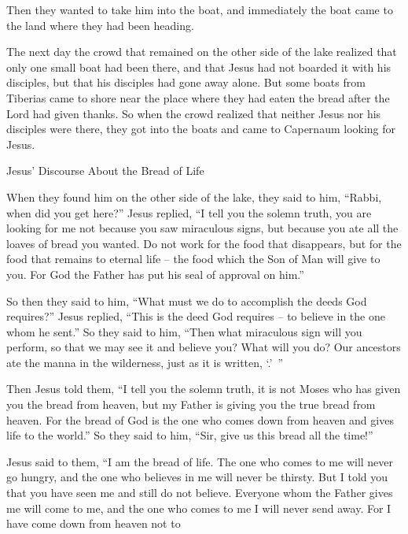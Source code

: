 {Then
they wanted
to take
him
into
the boat,
and
immediately
the boat
came
to
the land
where
they had been heading.
\par }{\PP {}The
next day
the crowd
that remained
on the other side
of the
lake
realized
that only one small boat
had been
there,
and
that
Jesus
had
not
boarded
it
with
his
disciples,
but
that his
disciples
had gone away
alone.
But some boats
from
Tiberias
came to shore
near
the place
where
they had eaten
the bread
after
the Lord
had given thanks.
So
when
the crowd
realized
that
neither Jesus
nor
his
disciples
were
there,
they got
into
the boats
and
came
to
Capernaum
looking
for Jesus.
\par }{\SH Jesus’ Discourse About the Bread of Life
\par }{\PP {}When
they found
him
on the other side
of the lake,
they said
to him,
“Rabbi,
when
did you get
here?”
Jesus
replied, “I tell
you
the solemn truth,
you are looking for
me
not
because
you saw
miraculous signs,
but
because
you ate
all the loaves of bread
you wanted.
Do
not
work
for the food
that disappears,
but
for the food
that remains
to
eternal
life
– the food which
the Son
of Man
will give
to you.
For
God
the Father
has put
his seal
of approval on him.”
\par }{\PP {}So then
they said
to
him,
“What
must we do
to
accomplish
the deeds
God requires?”
Jesus
replied, “This
is
the deed
God requires – to believe in the one whom he sent.”
So
they said
to him,
“Then
what
miraculous sign
will you perform,
so that
we may see
it and
believe
you? What
will you do?
Our
ancestors
ate
the manna
in
the wilderness,
just as
it is
written, ‘{}.’ ”
\par }{\PP {}Then
Jesus
told
them,
“I tell
you
the solemn truth,
it is not
Moses
who has given
you
the bread
from
heaven,
but
my
Father
is giving
you
the true
bread
from
heaven.
For
the bread
of God
is
the one who comes down
from
heaven
and
gives
life
to the world.”
So
they said
to
him,
“Sir,
give
us
this
bread
all the time!”
\par }{\PP {}Jesus
said
to them,
“I
am
the bread
of life.
The one who comes
to
me
will
never
go hungry,
and
the one who believes
in
me
will
never
be thirsty.
But
I told
you
that
you have seen
me
and
still do
not
believe.
Everyone
whom
the Father
gives
me
will come
to
me,
and
the one who comes
to
me
I will
never
send
away.
For
I have come down
from
heaven
not
to
}
